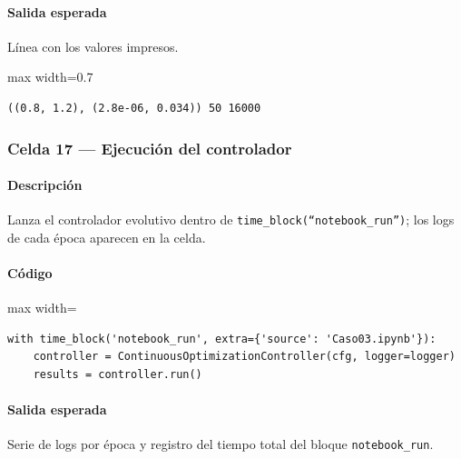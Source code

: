 \paragraph{Salida esperada} Línea con los valores impresos.

\begin{listing}[H]
\caption{Ejemplo Salida}
\begin{adjustbox}{max width=0.7\textwidth}
\begin{minipage}{\textwidth}
\begin{verbatim}
((0.8, 1.2), (2.8e-06, 0.034)) 50 16000
\end{verbatim}
\end{minipage}
\end{adjustbox}
\end{listing}

\subsubsection*{Celda 17 — Ejecución del controlador}
\paragraph{Descripción} Lanza el controlador evolutivo dentro de \texttt{time\_block(``notebook\_run'')}; los logs de cada época aparecen en la celda. %
\paragraph{Código}
\par\smallskip
\begin{listing}[H]
\caption{Celda 17: lanzamiento de la optimización}
\begin{adjustbox}{max width=\textwidth}
\begin{minipage}{\textwidth}
\begin{verbatim}
with time_block('notebook_run', extra={'source': 'Caso03.ipynb'}):
    controller = ContinuousOptimizationController(cfg, logger=logger)
    results = controller.run()
\end{verbatim}
\end{minipage}
\end{adjustbox}
\end{listing}
\paragraph{Salida esperada} Serie de logs por época y registro del tiempo total del bloque \texttt{notebook\_run}.

